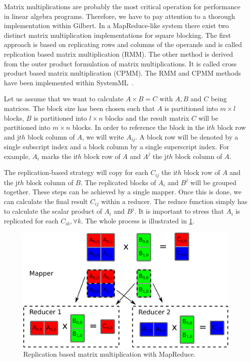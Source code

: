 Matrix multiplications are probably the most critical operation for performance in linear algebra programs.
Therefore, we have to pay attention to a thorough implementation within Gilbert.
In a MapReduce-like system there exist two distinct matrix multiplication implementations for square blocking.
The first approach is based on replicating rows and columns of the operands and is called replication based matrix multiplication (RMM).
The other method is derived from the outer product formulation of matrix multiplications.
It is called cross product based matrix multiplication (CPMM).
The RMM and CPMM methods have been implemented within SystemML~\cite{ghoting:2011a}.

Let us assume that we want to calculate $A \times B = C$ with $A,B$ and $C$ being matrices.
The block size has been chosen such that $A$ is partitioned into $m\times l$ blocks, $B$ is partitioned into $l \times n$ blocks and the result matrix $C$ will be partitioned into $m\times n$ blocks.
In order to reference the block in the i$th$ block row and j$th$ block column of $A$, we will write $A_{ij}$.
A block row will be denoted by a single subscript index and a block column by a single superscript index.
For example, $A_i$ marks the i$th$ block row of $A$ and $A^j$ the j$th$ block column of $A$.

The replication-based strategy will copy for each $C_{ij}$ the i$th$ block row of $A$ and the j$th$ block column of $B$.
The replicated blocks of $A_i$ and $B^j$ will be grouped together.
These steps can be achieved by a single mapper.
Once this is done, we can calculate the final result $C_{ij}$ within a reducer.
The reduce function simply has to calculate the scalar product of $A_i$ and $B^j$.
It is important to stress that $A_i$ is replicated for each $C_{ik},\forall k$.
The whole process is illustrated in \cref{fig:RMM}.

\begin{figure}[!h]
	\centering
	\includegraphics[width=0.4777\linewidth]{images/rmm.png}
	\caption{Replication based matrix multiplication with MapReduce.}
	\label{fig:RMM}
\end{figure}

